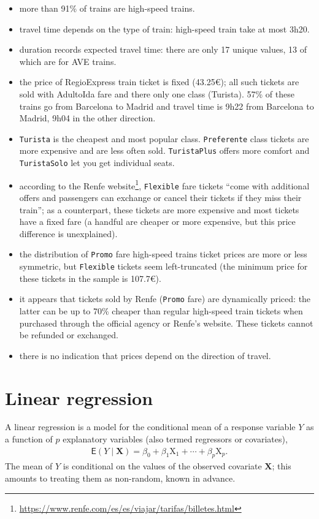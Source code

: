 \documentclass[
  11pt,
  letterpaper,
]{book}
\providecommand{\tightlist}{%
  \setlength{\itemsep}{0pt}\setlength{\parskip}{0pt}}
\renewcommand{\href}[2]{#2\footnote{\url{#1}}}
\theoremstyle{definition}
\theoremstyle{definition}
\theoremstyle{definition}
\theoremstyle{definition}
\theoremstyle{remark}
\begin{document}
\begin{itemize}
\tightlist
\item
  more than 91\% of trains are high-speed trains.
\item
  travel time depends on the type of train: high-speed train take at most 3h20.
\item
  duration records expected travel time: there are only 17 unique values, 13 of which are for AVE trains.
\item
  the price of RegioExpress train ticket is fixed (43.25€); all such tickets are sold with AdultoIda fare and there only one class (Turista). 57\% of these trains go from Barcelona to Madrid and travel time is 9h22 from Barcelona to Madrid, 9h04 in the other direction.
\item
  \texttt{Turista} is the cheapest and most popular class. \texttt{Preferente} class tickets are more expensive and are less often sold. \texttt{TuristaPlus} offers more comfort and \texttt{TuristaSolo} let you get individual seats.
\item
  according to the \href{https://www.renfe.com/es/es/viajar/tarifas/billetes.html}{Renfe website}, \texttt{Flexible} fare tickets ``come with additional offers and passengers can exchange or cancel their tickets if they miss their train''; as a counterpart, these tickets are more expensive and most tickets have a fixed fare (a handful are cheaper or more expensive, but this price difference is unexplained).
\item
  the distribution of \texttt{Promo} fare high-speed trains ticket prices are more or less symmetric, but \texttt{Flexible} tickets seem left-truncated (the minimum price for these tickets in the sample is 107.7€).
\item
  it appears that tickets sold by Renfe (\texttt{Promo} fare) are dynamically priced: the latter can be up to 70\% cheaper than regular high-speed train tickets when purchased through the official agency or Renfe's website. These tickets cannot be refunded or exchanged.
\item
  there is no indication that prices depend on the direction of travel.
\end{itemize}

\hypertarget{linear-regression}{%
\chapter{Linear regression}\label{linear-regression}}

A linear regression is a model for the conditional mean of a response variable \(Y\) as a function of \(p\) explanatory variables (also termed regressors or covariates),
\begin{align}
\mathsf{E}(Y \mid \mathbf{X})=\beta_0 + \beta_1\mathrm{X}_{1} + \cdots + \beta_p \mathrm{X}_{p}. \label{eq:linearreg}
\end{align}
The mean of \(Y\) is conditional on the values of the observed covariate \(\mathbf{X}\); this amounts to treating them as non-random, known in advance.
\end{document}
